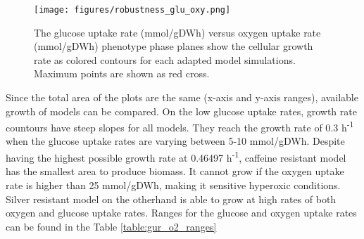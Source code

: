 \begin{figure}[H]
  \begin{center}
  \texttt{[image: figures/robustness\_glu\_oxy.png]}
  \caption[The glucose uptake rate (mmol/gDWh) versus oxygen uptake rate (mmol/gDWh) phenotype phase planes show the cellular growth rate as colored contours for each adapted model simulations]{The glucose uptake rate (mmol/gDWh) versus oxygen uptake rate (mmol/gDWh) phenotype phase planes show the cellular growth rate as colored contours for each adapted model simulations. Maximum points are shown as red cross.}
  \label{fig:robustness_glu_oxy}
  \end{center}
  \end{figure}
\vspace{-1.0cm}

 Since the total area of the plots are the same (x-axis and y-axis ranges), available growth of models can be compared. On the low glucose uptake rates, growth rate countours have steep slopes for all models. They reach the growth rate of 0.3 h\textsuperscript{-1} when the glucose uptake rates are varying between 5-10 mmol/gDWh. Despite having the highest possible growth rate at 0.46497 h\textsuperscript{-1}, caffeine resistant model has the smallest area to produce biomass. It cannot grow if the oxygen uptake rate is higher than 25 mmol/gDWh, making it sensitive hyperoxic conditions. Silver resistant model on the otherhand is able to grow at high rates of both oxygen and glucose uptake rates. Ranges for the glucose and oxygen uptake rates can be found in the Table \ref{table:gur_o2_ranges}

